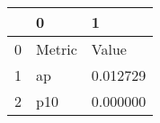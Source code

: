 \begin{tabular}{lll}
\toprule
 & 0 & 1 \\
\midrule
0 & Metric & Value \\
1 & ap & 0.012729 \\
2 & p10 & 0.000000 \\
\bottomrule
\end{tabular}
